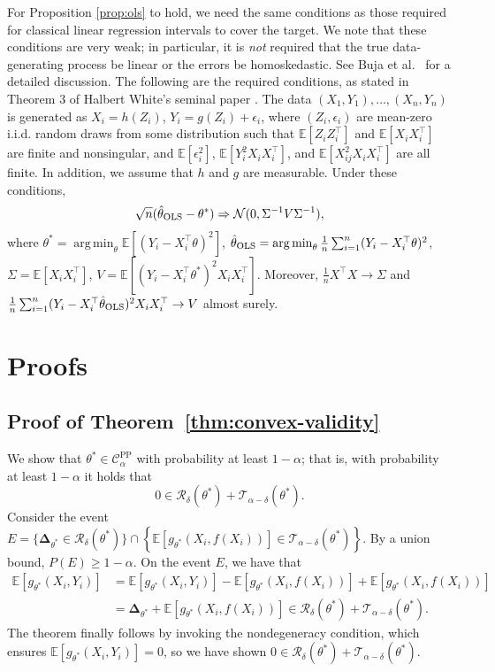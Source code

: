 \documentclass[10pt]{article}
\def\E{\mathbb{E}}
\newcommand{\T}{\mathcal{T}}
\newcommand{\cR}{\mathcal{R}}
\newcommand{\rec}{\mathbf{\Delta}}
\newcommand{\CPP}{\mathcal{C}^{\mathrm{PP}}}
\DeclareMathOperator*{\argmin}{arg\,min}
\begin{document}
For Proposition \ref{prop:ols} to hold, we need the same conditions as those required for classical linear regression intervals to cover the target. We note that these conditions are very weak; in particular, it is \emph{not} required that the true data-generating process be linear or the errors be homoskedastic. See Buja et al.~\cite{buja2019models} for a detailed discussion. The following are the required conditions, as stated in Theorem 3 of Halbert White's seminal paper \cite{white1980using}. The data $(X_1,Y_1),\dots,(X_n,Y_n)$ is generated as $X_i = h(Z_i)$, $Y_i = g(Z_i) + \epsilon_i$, where $(Z_i,\epsilon_i)$ are mean-zero i.i.d. random draws from some distribution such that $\E[Z_i Z_i^\top]$ and $\E[X_i X_i^\top]$ are finite and nonsingular, and $\E[\epsilon_i^2]$, $\E[Y_i^2 X_i X_i^\top]$, and $\E[X_{ij}^2 X_i X_i^\top]$ are all finite. In addition, we assume that $h$ and $g$ are measurable. Under these conditions,
$$\sqrt{n} (\hat \theta_{\rm OLS} - \theta^*) \Rightarrow \mathcal{N}(0,\Sigma^{-1}V\Sigma^{-1}),$$
where $\theta^* = \argmin_\theta \E [(Y_i - X_i^\top \theta)^2]$, $\hat \theta_{\rm OLS} = \argmin_\theta \frac{1}{n} \sum_{i=1}^n (Y_i - X_i^\top \theta)^2$, $\Sigma = \E[X_i X_i^\top]$, $V = \E[(Y_i - X_i^\top \theta^*)^2 X_i X_i^\top]$. Moreover, $\frac{1}{n} X^\top X \rightarrow \Sigma$ and $\frac{1}{n} \sum_{i=1}^n (Y_i - X_i^\top \hat\theta_{\rm OLS})^2 X_i X_i^\top \rightarrow V$ almost surely.






\section{Proofs}
\label{app:proofs}





\subsection{Proof of Theorem~\ref{thm:convex-validity}}


We show that $\theta^*\in\CPP_\alpha$ with probability at least $1-\alpha$; that is, with probability at least $1-\alpha$ it holds that
$$0\in\cR_\delta(\theta^*) + \T_{\alpha-\delta}(\theta^*).$$
Consider the event $E = \{\rec_{\theta^*} \in \cR_\delta(\theta^*) \} \cap \left\{\E [g_{\theta^*}(X_i, f(X_i))] \in \T_{\alpha-\delta}(\theta^*)\right\}$.
By a union bound, $P(E)\geq 1-\alpha$.
On the event $E$, we have that
\begin{align}
\E [g_{\theta^*}(X_i, Y_i)] &=  \E [g_{\theta^*}(X_i, Y_i)] - \E [g_{\theta^*}(X_i, f(X_i))] + \E[g_{\theta^*}(X_i, f(X_i))]\\
&= \rec_{\theta^*} + \E[g_{\theta^*}(X_i, f(X_i))] \in \cR_\delta(\theta^*) + \T_{\alpha-\delta}(\theta^*).
\end{align}
The theorem finally follows by invoking the nondegeneracy condition, which ensures $\E [g_{\theta^*}(X_i, Y_i)] = 0$, so we have shown $0\in\cR_\delta(\theta^*) + \T_{\alpha-\delta}(\theta^*)$.
\end{document}
